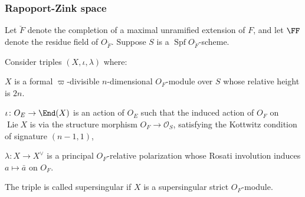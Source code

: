 \documentclass[11pt]{beamer}
\DeclareMathOperator{\Lie}{Lie}
\DeclareMathOperator{\Spf}{Spf}
\renewcommand{\OO}{O}
\newcommand{\Sheaf}{\mathcal O}
\begin{document}
\begin{frame}
  \frametitle{Rapoport-Zink space}
  \begin{itemize}
    \ii Let $\breve F$ denote the completion of a maximal unramified extension of $F$,
    and let $\FF$ denote the residue field of $\OO_{\breve F}$.
    \ii Suppose $S$ is a $\Spf \OO_{\breve F}$-scheme.
  \end{itemize}
  \begin{definition}
  Consider triples $(X, \iota, \lambda)$ where:
  \begin{itemize}
    \ii $X$ is a formal $\varpi$-divisible $n$-dimensional $\OO_F$-module over $S$
    whose relative height is $2n$.

    \ii $\iota \colon \OO_E \to \End(X)$ is an action of $\OO_E$
    such that the induced action of $\OO_F$ on $\Lie X$
    is via the structure morphism $\OO_F \to \Sheaf_S$,
    satisfying the Kottwitz condition of signature $(n-1,1)$,

    \ii $\lambda \colon X \to X^\vee$ is a principal $\OO_F$-relative polarization
    whose Rosati involution induces $a \mapsto \bar a$ on $\OO_F$.
   \end{itemize}
  \end{definition}
  The triple is called supersingular if $X$ is a supersingular strict $\OO_F$-module.
\end{frame}
\end{document}
